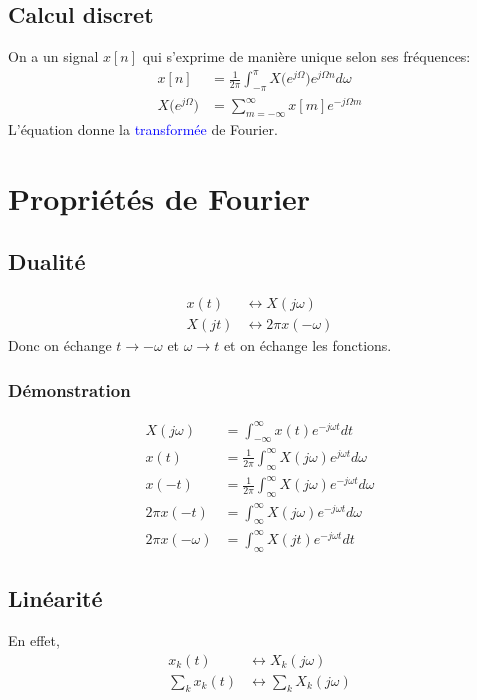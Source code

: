 \documentclass{report}
\begin{document}
\subsection{Calcul discret}
On a un signal $x[n]$ qui s'exprime de manière unique selon ses fréquences:
\begin{align}
x[n] &= \frac{1}{2\pi}\int_{-\pi}^{\pi} X \bigl(e^{j\Omega} \bigl) e^{j\Omega n} d\omega\\
X\bigl(e^{j\Omega} \bigl) &= \sum_{m=-\infty}^{\infty} x[m]e^{-j\Omega m} \label{eq:transfoDF}
\end{align}
L'équation \label{eq:transfoDF} donne la \textcolor{blue}{transformée} de Fourier.


\section{Propriétés de Fourier} \label{proprF}

\subsection{Dualité} \label{Dua}
\begin{align}
x(t) & \longleftrightarrow X(j\omega)\\
X(jt) & \longleftrightarrow 2\pi x(-\omega)
\end{align}
Donc on échange $t \rightarrow -\omega$ et $\omega \rightarrow t$ et on échange les fonctions.
\subsubsection{Démonstration}
\begin{align*}
X(j \omega) &= \int_{-\infty}^{\infty} x(t) e^{-j\omega t} dt\\
x(t) &= \frac{1}{2\pi} \int_{\infty}^{\infty} X(j\omega) e^{j\omega t} d\omega\\
x(-t) &= \frac{1}{2\pi} \int_{\infty}^{\infty} X(j\omega) e^{-j\omega t} d\omega\\
2 \pi x(-t) &= \int_{\infty}^{\infty} X(j\omega) e^{-j\omega t} d\omega\\
2 \pi x(-\omega) &= \int_{\infty}^{\infty} X(jt) e^{-j\omega t} dt
\end{align*}

\subsection{Linéarité}
En effet,
\begin{align*}
x_k(t) & \longleftrightarrow X_k(j\omega)\\
\sum_k x_k(t) & \longleftrightarrow \sum_k X_k(j\omega)
\end{align*}
\end{document}
